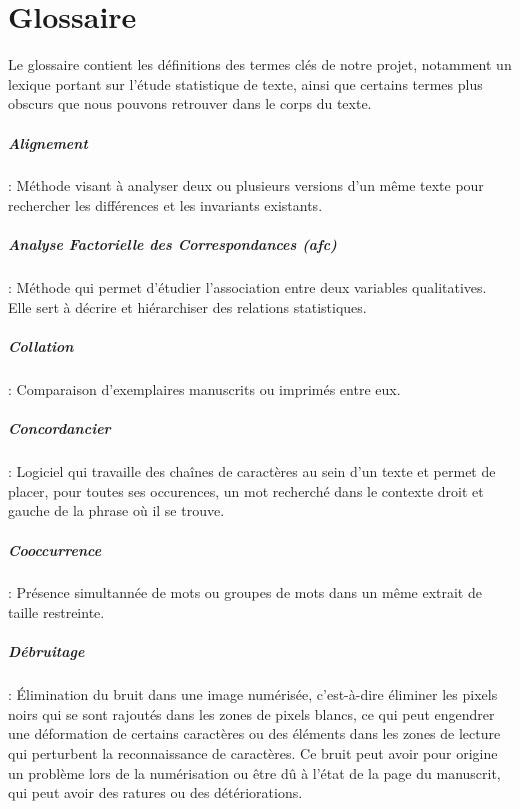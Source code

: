 \chapter{Glossaire}

Le glossaire contient les définitions des termes clés de notre projet, notamment un lexique portant sur l'étude statistique de texte, ainsi que certains termes plus obscurs que nous pouvons retrouver dans le corps du texte.

\paragraph{Alignement} : Méthode visant à analyser deux ou plusieurs versions d'un même texte pour rechercher les différences et les invariants existants.

\paragraph{Analyse Factorielle des Correspondances (\acrshort{afc})} : Méthode qui permet d'étudier l'association entre deux variables qualitatives. Elle sert à décrire et hiérarchiser des relations statistiques.

\paragraph{Collation} : Comparaison d'exemplaires manuscrits ou imprimés entre eux.

\paragraph{Concordancier} : Logiciel qui travaille des chaînes de caractères au sein d'un texte et permet de placer, pour toutes ses occurences, un mot recherché dans le contexte droit et gauche de la phrase où il se trouve.

\paragraph{Cooccurrence} : Présence simultannée de mots ou groupes de mots dans un même extrait de taille restreinte.

\paragraph{\og Débruitage \fg{}} : Élimination du \og bruit \fg{} dans une image numérisée, c'est-à-dire éliminer les pixels noirs qui se sont rajoutés dans les zones de pixels blancs, ce qui peut engendrer une déformation de certains caractères ou des éléments dans les zones de lecture qui perturbent la reconnaissance de caractères. Ce bruit peut avoir pour origine un problème lors de la numérisation ou être dû à l'état de la page du manuscrit, qui peut avoir des ratures ou des détériorations.

